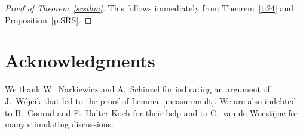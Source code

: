 \documentclass[12pt]{amsart}
\theoremstyle{definition}
\theoremstyle{remark}
\numberwithin{equation}{section}
\begin{document}
\begin{proof}[{Proof of Theorem~\ref{srsthm}}]
This follows immediately from Theorem~\ref{t:24} and Proposition~\ref{p:SRS}.
\end{proof}

\section*{Acknowledgments}
We thank W.~Narkiewicz and A.~Schinzel for indicating an argument of J.~W\'ojcik that led to the proof of Lemma~\ref{measuremult}.
We are also indebted to B.~Conrad and F.~Halter-Koch for their help and to C.~van de Woestijne for many stimulating discussions.



\end{document}
